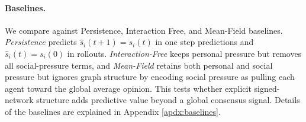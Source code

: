 \paragraph{Baselines.} We compare against Persistence, Interaction Free, and Mean-Field baselines. \textit{Persistence} predicts \(\hat{s}_i(t+1)=s_i(t)\) in one step predictions and $\hat{s}_i(t)=s_i(0)$ in rollouts. \textit{Interaction-Free} keeps personal pressure
but removes all social-pressure terms, and \textit{Mean-Field} retains both personal and
social pressure but ignores graph structure by encoding social pressure as pulling each agent
toward the global average opinion. This tests whether explicit signed-network structure adds predictive value beyond a global consensus signal. Details of the baselines are explained in Appendix \ref{apdx:baselines}. 
